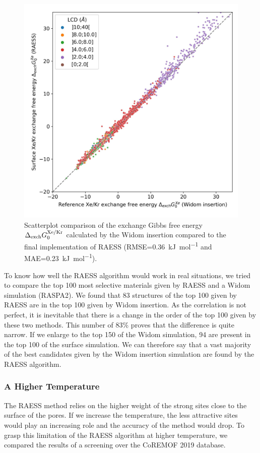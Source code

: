 \documentclass[main]{subfiles}
\begin{document}
\begin{figure}[ht]
\centering
  \includegraphics[width=0.5\linewidth]{figures/3-fastsim/G_XeKr_widom_vs_G_XeKr_surface_zoom.jpg}
  \caption{Scatterplot comparison of the exchange Gibbs free energy $\Delta_{\text{exch}}G_{\text{0}}^{\text{Xe/Kr}}$ calculated by the Widom insertion compared to the final implementation of RAESS (RMSE=\SI{0.36}{\kilo\joule\per\mole} and MAE=\SI{0.23}{\kilo\joule\per\mole}).}\label{fgr:exch_free_energy}
\end{figure}

To know how well the RAESS algorithm would work in real situations, we tried to compare the top 100 most selective materials given by RAESS and a Widom simulation (RASPA2). We found that 83 structures of the top 100 given by RAESS are in the top 100 given by Widom insertion. As the correlation is not perfect, it is inevitable that there is a change in the order of the top 100 given by these two methods. This number of {83\%} proves that the difference is quite narrow. If we enlarge to the top 150 of the Widom simulation, 94 are present in the top 100 of the surface simulation. We can therefore say that a vast majority of the best candidates given by the Widom insertion simulation are found by the RAESS algorithm.


\subsubsection{A Higher Temperature}

The RAESS method relies on the higher weight of the strong sites close to the surface of the pores. If we increase the temperature, the less attractive sites would play an increasing role and the accuracy of the method would drop. To grasp this limitation of the RAESS algorithm at higher temperature, we compared the results of a screening over the CoREMOF 2019 database.  
\end{document}

